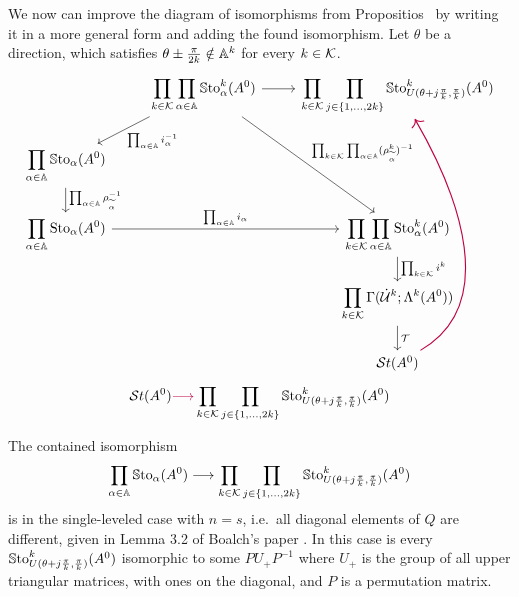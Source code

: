 \begin{cor}
  We now can improve the diagram of isomorphisms from
  Propositios~\label{prop:decompositionDiagram} by writing it in a more general
  form and adding the found isomorphism.
  Let $\theta$ be a direction, which satisfies
  $\theta\pm\frac{\pi}{2k}\notin\mathbb{A}^k$ for every $k\in\mathcal{K}$.
  \[ \begin{tikzcd}
      &\displaystyle\prod_{k\in\cK}\prod_{\alpha\in\A}\SSto_{\alpha}^{k}(A^0)
       \arrow[dl,"\prod_{\alpha\in\A}i_\alpha^{-1}"]
       \arrow[ddr,
         "\prod_{k\in\cK}\prod_{\alpha\in\A}(\rho_{\tilde\alpha}^k)^{-1}"]
       \arrow[r]
      &\displaystyle\prod_{k\in\cK} \prod_{j\in\{1,\dots,2k\}}
       \SSto_{U(\theta+j\frac{\pi}{k},\frac{\pi}{k})}^k(A^0)
    \\ \displaystyle\prod_{\alpha\in\A} \SSto_{\alpha}(A^0)
        \dar{\prod_{\alpha\in\A}\rho_{\tilde\alpha}^{-1}}
    \\\displaystyle\prod_{\alpha\in\A} \Sto_{\alpha}(A^0)
      \arrow[rr,"\prod_{\alpha\in\A}i_\alpha"]
      &&\displaystyle\prod_{k\in\cK}\prod_{\alpha\in\A}\Sto_{\alpha}^{k}(A^0)
      \dar{\prod_{k\in\cK}i^k}
    \\
      && \displaystyle\prod_{k\in\cK}\Gamma(\dot\cU^k;\Lambda^k(A^0))
      \dar{\cT}
    \\&& \St(A^0)
      \arrow[purple,uuuu,out=30,in=-60,thick]
  \end{tikzcd} \]
  \[
    \mathcal{S}{}t(A^0) \textcolor{purple}{\longrightarrow}
    \prod_{k\in\mathcal{K}} \prod_{j\in\{1,\dots,2k\}}
    \operatorname{\mathbb{S}to}_{U(\theta+j\frac{\pi}{k},\frac{\pi}{k})}^k(A^0)
  \]

  \begin{s-rem}
    The contained isomorphism
    \[
      \prod_{\alpha\in\mathbb{A}}\operatorname{\mathbb{S}to}_{\alpha}(A^0) \longrightarrow
      \prod_{k\in\mathcal{K}} \prod_{j\in\{1,\dots,2k\}}
      \operatorname{\mathbb{S}to}_{U(\theta+j\frac{\pi}{k},\frac{\pi}{k})}^k(A^0)
    \]
    is in the single-leveled case with $n=s$, i.e.\ all diagonal elements of
    $Q$ are different, given in Lemma 3.2 of Boalch's paper
    \cite[Lem.3.2]{boalch}.
    In this case is every
    $\operatorname{\mathbb{S}to}_{U(\theta+j\frac{\pi}{k},\frac{\pi}{k})}^k(A^0)$ isomorphic to some
    $PU_+P^{-1}$ where $U_+$ is the group of all upper triangular matrices,
    with ones on the diagonal, and $P$ is a permutation matrix.
  \end{s-rem}
\end{cor}

\PROBLEM{}
